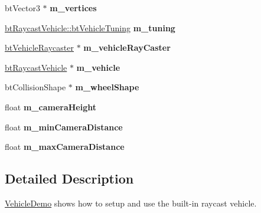 \begin{DoxyCompactItemize}
\item 
\hypertarget{class_vehicle_demo_aaf94715532062448fc1b0dcae8fba0eb}{bt\+Vector3 $\ast$ {\bfseries m\+\_\+vertices}}\label{class_vehicle_demo_aaf94715532062448fc1b0dcae8fba0eb}

\item 
\hypertarget{class_vehicle_demo_ae516bb8b680f4590c107ccfabca98df3}{\hyperlink{classbt_raycast_vehicle_1_1bt_vehicle_tuning}{bt\+Raycast\+Vehicle\+::bt\+Vehicle\+Tuning} {\bfseries m\+\_\+tuning}}\label{class_vehicle_demo_ae516bb8b680f4590c107ccfabca98df3}

\item 
\hypertarget{class_vehicle_demo_ade5bbe0c056b5d41a7ac3aea039a15f0}{\hyperlink{structbt_vehicle_raycaster}{bt\+Vehicle\+Raycaster} $\ast$ {\bfseries m\+\_\+vehicle\+Ray\+Caster}}\label{class_vehicle_demo_ade5bbe0c056b5d41a7ac3aea039a15f0}

\item 
\hypertarget{class_vehicle_demo_a9986443961684a4bcb5d9b5e0a0bbce8}{\hyperlink{classbt_raycast_vehicle}{bt\+Raycast\+Vehicle} $\ast$ {\bfseries m\+\_\+vehicle}}\label{class_vehicle_demo_a9986443961684a4bcb5d9b5e0a0bbce8}

\item 
\hypertarget{class_vehicle_demo_aca455000f6fc39bdb2e87b3764da1650}{bt\+Collision\+Shape $\ast$ {\bfseries m\+\_\+wheel\+Shape}}\label{class_vehicle_demo_aca455000f6fc39bdb2e87b3764da1650}

\item 
\hypertarget{class_vehicle_demo_ae8a2026aea48c3aecc3325c76ece84c3}{float {\bfseries m\+\_\+camera\+Height}}\label{class_vehicle_demo_ae8a2026aea48c3aecc3325c76ece84c3}

\item 
\hypertarget{class_vehicle_demo_a748570e633c24e5b8be85bd05348878c}{float {\bfseries m\+\_\+min\+Camera\+Distance}}\label{class_vehicle_demo_a748570e633c24e5b8be85bd05348878c}

\item 
\hypertarget{class_vehicle_demo_a99a480b15afc83d84fa18dd4d53db7c4}{float {\bfseries m\+\_\+max\+Camera\+Distance}}\label{class_vehicle_demo_a99a480b15afc83d84fa18dd4d53db7c4}

\end{DoxyCompactItemize}


\subsection{Detailed Description}
\hyperlink{class_vehicle_demo}{Vehicle\+Demo} shows how to setup and use the built-\/in raycast vehicle. 

